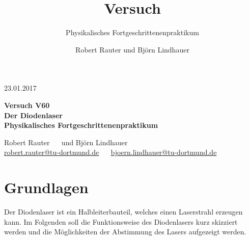 \documentclass[captions=tableheading]{scrartcl}
\title{Versuch \versuchnummer\\ \versuchname}
\subtitle{Physikalisches Fortgeschrittenenpraktikum}
\author{Robert Rauter und Björn Lindhauer}
\date{\versuchdatum}
\newcommand{\versuchnummer}{V60}
\newcommand{\versuchname}{Der Diodenlaser}
\newcommand{\versuchdatum}{23.01.2017}
\let\oldsection\section
\renewcommand\section{\clearpage\oldsection}
\begin{document}
\begin{titlepage}
{\large \versuchdatum}
\vspace{7cm}
\begin{center}
\textbf{\huge Versuch \versuchnummer}\\\vspace{0.5cm}
\textbf{\huge \versuchname}\\
\vspace{0.2cm}
\textbf{Physikalisches Fortgeschrittenenpraktikum}\\
\vspace{9cm}

{\Large Robert Rauter \ \ \hspace{1.5cm} und \hspace{1.5cm} Björn Lindhauer}\\
{ \url{robert.rauter@tu-dortmund.de} \ \ \hspace{2cm} \url{bjoern.lindhauer@tu-dortmund.de}}
\end{center}
\end{titlepage}

\section{Grundlagen}
Der Diodenlaser ist ein Halbleiterbauteil, welches einen Laserstrahl erzeugen kann. Im Folgenden soll die Funktionsweise des Diodenlasers kurz skizziert werden und die Möglichkeiten der Abstimmung des Lasers aufgezeigt werden.
\end{document}
